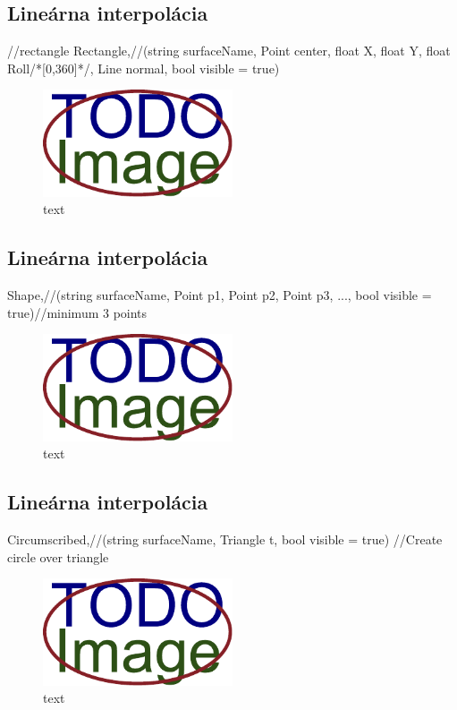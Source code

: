 \subsection{Lineárna interpolácia}
	//rectangle
	Rectangle,//(string surfaceName, Point center, float X, float Y, float Roll/*[0,360]*/, Line normal, bool visible = true)

\begin{figure}[H]
	\centering
	\includegraphics[width=0.5\textwidth]{obrazky-figures/placeholder.pdf}
	\caption{text}
	\label{fig:1}
\end{figure}


\subsection{Lineárna interpolácia}
	Shape,//(string surfaceName, Point p1, Point p2, Point p3, ..., bool visible = true)//minimum 3 points 

\begin{figure}[H]
	\centering
	\includegraphics[width=0.5\textwidth]{obrazky-figures/placeholder.pdf}
	\caption{text}
	\label{fig:1}
\end{figure}



\subsection{Lineárna interpolácia}
	Circumscribed,//(string surfaceName, Triangle t, bool visible = true) //Create circle over triangle

\begin{figure}[H]
	\centering
	\includegraphics[width=0.5\textwidth]{obrazky-figures/placeholder.pdf}
	\caption{text}
	\label{fig:1}
\end{figure}

